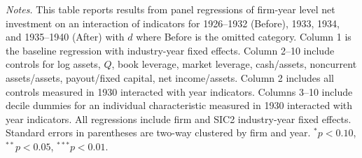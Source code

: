 \begin{table}[p]
\vspace*{3mm} \justifying \noindent
\footnotesize{\textit{Notes.} This table reports results from panel regressions of firm-year level net investment on an interaction of indicators for 1926--1932 (Before), 1933, 1934, and 1935--1940 (After) with $d$ where Before is the omitted category. Column 1 is the baseline regression with industry-year fixed effects. Column 2--10 include controls for log assets, $Q$, book leverage, market leverage, cash/assets, noncurrent assets/assets, payout/fixed capital, net income/assets. Column 2 includes all controls measured in 1930 interacted with year indicators. Columns 3--10 include decile dummies for an individual characteristic measured in 1930 interacted with year indicators. All regressions include firm and SIC2 industry-year fixed effects. Standard errors in parentheses are two-way clustered by firm and year. $^{*}p<0.10$, $^{**}p<0.05$, $^{***}p<0.01$.}
\end{table}

